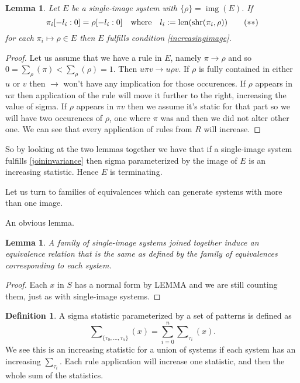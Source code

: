\documentclass[a4paper, 11pt]{article}
\newtheorem{lemma}[theorem]{Lemma}
\theoremstyle{definition}
\newtheorem{definition}[theorem]{Definition}
\newcommand{\Sym}{S}
\DeclareMathOperator{\img}{img}
\DeclareMathOperator{\len}{len}
\DeclareMathOperator{\shr}{shr}
\begin{document}
\begin{lemma}
    Let $E$ be a single-image system with $\{\rho\} = \img(E)$. If
    \[
        \pi_i[-l_i:0] = \rho[-l_i:0] \quad \textnormal{where} \quad l_i :=
        \len(\shr(\pi_i, \rho)) \tag{$\ast\ast$} \label{joininvariance}
    \]
    for each $\pi_i \mapsto \rho \in E$ then $E$ fulfills condition
    \eqref{increasingimage}. \end{lemma}
\begin{proof}
    Let us assume that we have a rule in $E$, namely $\pi \to \rho$ and so
    $0 = \sum_\rho(\pi) < \sum_\rho(\rho) = 1$. Then $u \pi v \to u \rho v$. 
    If $\rho$ is fully contained in either $u$ or $v$ then $\to$ won't have any
    implication for those occurences. If $\rho$ appears in $u\pi$ then
    application of the rule will move it further to the right, increasing the
    value of sigma. If $\rho$ appears in $\pi v$ then we assume it's static for
    that part so we will have two occurences of $\rho$, one where $\pi$ was and
    then we did not alter other one.
    We can see that every application of rules from $R$ will increase.
\end{proof}

So by looking at the two lemmas together we have that if a single-image system
fulfills \eqref{joininvariance} then sigma parameterized by the image of $E$ is
an increasing statistic. Hence $E$ is terminating.

Let us turn to families of equivalences which can generate systems with more
than one image.

An obvious lemma.
\begin{lemma}
    A family of single-image systems joined together induce an equivalence
    relation that is the same as defined by the family of equivalences
    corresponding to each system.
\end{lemma}
\begin{proof}
    Each $x$ in $\Sym$ has a normal form by LEMMA and we are still counting
    them, just as with single-image systems.
\end{proof}

\begin{definition}
    A sigma statistic parameterized by a set of patterns is defined as
    $$
        \sum\nolimits_{\{\tau_0, ..., \tau_n\}}(x) = \sum_{i=0}^{n} \sum\nolimits_{\tau_i}(x).
    $$
    We see this is an increasing statistic for a union of systems if
    each system has an increasing $\sum_{\tau_i}$.  Each rule application will
    increase one statistic, and then the whole sum of the statistics.
\end{definition}
\end{document}
